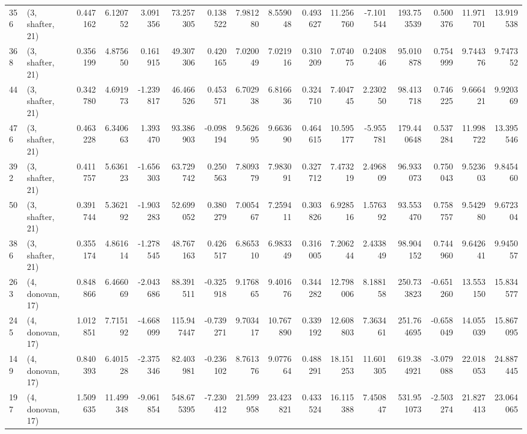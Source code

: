 \begin{tabular}{llrrrrrrrrrrrrrr}
356 &  (3, shafter, 21) &   0.447162 &   6.120752 &   3.091356 &    73.257305 &   0.138522 &   7.981280 &   8.559048 &  0.493627 &  11.256760 &  -7.101544 &   193.753539 &  0.500376 &  11.971701 &  13.919538 \\
368 &  (3, shafter, 21) &   0.356199 &   4.875650 &   0.161915 &    49.307306 &   0.420165 &   7.020049 &   7.021916 &  0.310209 &   7.074075 &   0.240846 &    95.010878 &  0.754999 &   9.744376 &   9.747352 \\
44  &  (3, shafter, 21) &   0.342780 &   4.691973 &  -1.239817 &    46.466526 &   0.453571 &   6.702938 &   6.816636 &  0.324710 &   7.404745 &   2.230250 &    98.413718 &  0.746225 &   9.666421 &   9.920369 \\
476 &  (3, shafter, 21) &   0.463228 &   6.340663 &   1.393470 &    93.386903 &  -0.098194 &   9.562695 &   9.663690 &  0.464615 &  10.595177 &  -5.955781 &   179.440648 &  0.537284 &  11.998722 &  13.395546 \\
392 &  (3, shafter, 21) &   0.411757 &   5.636123 &  -1.656303 &    63.729742 &   0.250563 &   7.809379 &   7.983091 &  0.327712 &   7.473219 &   2.496809 &    96.933073 &  0.750043 &   9.523603 &   9.845460 \\
50  &  (3, shafter, 21) &   0.391744 &   5.362192 &  -1.903283 &    52.699052 &   0.380279 &   7.005467 &   7.259411 &  0.303826 &   6.928516 &   1.576392 &    93.553470 &  0.758757 &   9.542980 &   9.672304 \\
386 &  (3, shafter, 21) &   0.355174 &   4.861614 &  -1.278545 &    48.767163 &   0.426517 &   6.865310 &   6.983349 &  0.316005 &   7.206244 &   2.433849 &    98.904152 &  0.744960 &   9.642641 &   9.945057 \\
263 &  (4, donovan, 17) &   0.848866 &   6.466069 &  -2.043686 &    88.391511 &  -0.325918 &   9.176865 &   9.401676 &  0.344282 &  12.798006 &   8.188158 &   250.733823 & -0.651260 &  13.553150 &  15.834577 \\
245 &  (4, donovan, 17) &   1.012851 &   7.715192 &  -4.668099 &   115.947447 &  -0.739271 &   9.703417 &  10.767890 &  0.339192 &  12.608803 &   7.363461 &   251.764695 & -0.658049 &  14.055039 &  15.867095 \\
149 &  (4, donovan, 17) &   0.840393 &   6.401528 &  -2.375346 &    82.403981 &  -0.236102 &   8.761376 &   9.077664 &  0.488291 &  18.151253 &  11.601305 &   619.384921 & -3.079088 &  22.018053 &  24.887445 \\
197 &  (4, donovan, 17) &   1.509635 &  11.499348 &  -9.061854 &   548.675395 &  -7.230412 &  21.599958 &  23.423821 &  0.433524 &  16.115388 &   7.450847 &   531.951073 & -2.503274 &  21.827413 &  23.064065 \\

\end{tabular}
